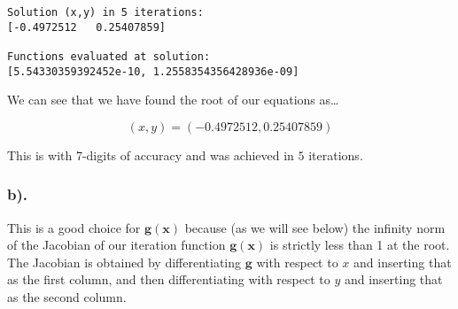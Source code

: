 \documentclass[11pt]{article}
\begin{document}
    \begin{Verbatim}[commandchars=\\\{\}]
Solution (x,y) in 5 iterations:
[-0.4972512   0.25407859]

Functions evaluated at solution:
[5.54330359392452e-10, 1.2558354356428936e-09]
    \end{Verbatim}

    We can see that we have found the root of our equations as\ldots{}

\[ \boxed{(x,y)=(-0.4972512, 0.25407859)} \]

This is with 7-digits of accuracy and was achieved in \(\boxed{5}\)
iterations.

    \hypertarget{b.}{%
\subsubsection{b).}\label{b.}}

This is a good choice for \(\mathbf{g}(\mathbf{x})\) because (as we will
see below) the infinity norm of the Jacobian of our iteration function
\(\mathbf{g}(\mathbf{x})\) is strictly less than 1 at the root. The
Jacobian is obtained by differentiating \(\mathbf{g}\) with respect to
\(x\) and inserting that as the first column, and then differentiating
with respect to \(y\) and inserting that as the second column.
\end{document}
